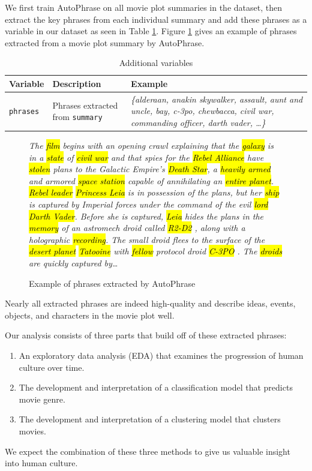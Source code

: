 \documentclass[hidelinks]{article}
\begin{document}
\begin{multicols}{2}
We first train AutoPhrase on all movie plot summaries in the dataset, then extract the key phrases from each individual summary and add these phrases as a variable in our dataset as seen in Table \ref{table:additional_variables}. Figure \ref{figure:key_phrases_example} gives an example of phrases extracted from a movie plot summary by AutoPhrase.

\begin{table}
\caption{Additional variables}
\centering
\begin{tabularx}{.8\textwidth}{llX}
    \textbf{Variable} & \textbf{Description} & \textbf{Example} \\
    \hline
    \texttt{phrases} & Phrases extracted from \texttt{summary} & \textit{\{alderaan, anakin skywalker, assault, aunt and uncle, bay, c-3po, chewbacca, civil war, commanding officer, darth vader, \ldots\}} \\
\end{tabularx}
\label{table:additional_variables}
\end{table}

\begin{figure}
\caption{Example of phrases extracted by AutoPhrase}
\begin{quoting}[leftmargin=.1\textwidth]
\small\textit{The \hl{film} begins with an opening crawl explaining that the \hl{galaxy} is in a \hl{state} of \hl{civil war} and that spies for the \hl{Rebel Alliance} have \hl{stolen} plans to the Galactic Empire's \hl{Death Star}, a \hl{heavily armed} and armored \hl{space station} capable of annihilating an \hl{entire planet}. \hl{Rebel leader} \hl{Princess Leia} is in possession of the plans, but her \hl{ship} is captured by Imperial forces under the command of the evil \hl{lord} \hl{Darth Vader}. Before she is captured, \hl{Leia} hides the plans in the \hl{memory} of an astromech droid called \hl{R2-D2} , along with a holographic \hl{recording}. The small droid flees to the surface of the \hl{desert planet} \hl{Tatooine} with \hl{fellow} protocol droid \hl{C-3PO} . The \hl{droids} are quickly captured by\ldots}
\end{quoting}
\label{figure:key_phrases_example}
\end{figure}

Nearly all extracted phrases are indeed high-quality and describe ideas, events, objects, and characters in the movie plot well.

Our analysis consists of three parts that build off of these extracted phrases:
\begin{enumerate}
    \item An exploratory data analysis (EDA) that examines the progression of human culture over time.
    \item The development and interpretation of a classification model that predicts movie genre.
    \item The development and interpretation of a clustering model that clusters movies.
\end{enumerate}
We expect the combination of these three methods to give us valuable insight into human culture.

\end{multicols}
\end{document}
